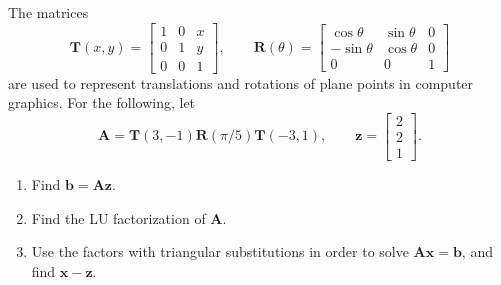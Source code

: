 \begin{exercise}\label{ex:2.7}

	The matrices
	\[
		\mathbf{T}(x,y) = \begin{bmatrix}
			1 & 0 & x \\
			0 & 1 & y \\
			0 & 0 & 1
		\end{bmatrix},\qquad
		\mathbf{R}(\theta) = \begin{bmatrix}
			\cos\theta  & \sin \theta & 0 \\
			-\sin\theta & \cos \theta & 0 \\
			0           & 0           & 1
		\end{bmatrix}
	\]
	are used to represent translations and rotations of plane points in computer
	graphics. For the following, let
	\[
		\mathbf{A} = \mathbf{T}(3,-1)\mathbf{R}(\pi/5)\mathbf{T}(-3,1), \qquad
		\mathbf{z} = \begin{bmatrix}2 \\ 2 \\ 1
		\end{bmatrix}.
	\]
	\begin{enumerate}[label = (\alph*)]
		\item Find $\mathbf{b} = \mathbf{A}\mathbf{z}$.
		\item Find the LU factorization of $\mathbf{A}$.
		\item Use the factors with triangular substitutions in order to solve
		      $\mathbf{A}\mathbf{x}=\mathbf{b}$, and find $\mathbf{x}-\mathbf{z}$.
	\end{enumerate}

\end{exercise}

